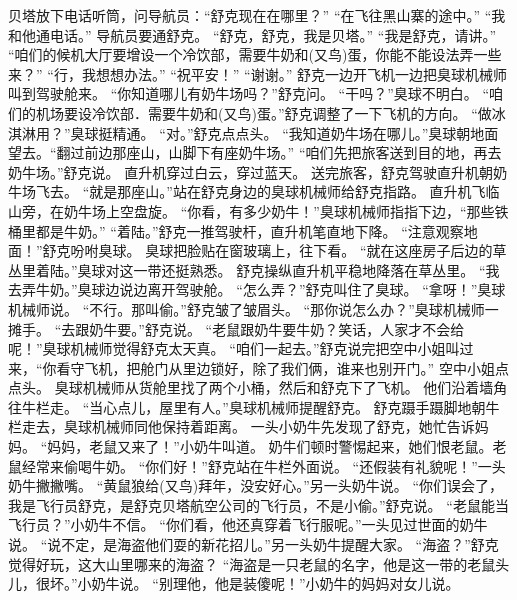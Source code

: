 \documentclass[a4paper,12pt,UTF8,twoside]{ctexbook}
\begin{document}
        贝塔放下电话听筒，问导航员：“舒克现在在哪里？” 
        “在飞往黑山寨的途中。” 
        “我和他通电话。” 
        导航员要通舒克。 
        “舒克，舒克，我是贝塔。” 
        “我是舒克，请讲。” 
        “咱们的候机大厅要增设一个冷饮部，需要牛奶和(又鸟)蛋，你能不能设法弄一些来？” 
        “行，我想想办法。” 
        “祝平安！” 
        “谢谢。” 
        舒克一边开飞机一边把臭球机械师叫到驾驶舱来。 
        “你知道哪儿有奶牛场吗？”舒克问。 
        “干吗？”臭球不明白。 
        “咱们的机场要设冷饮部．需要牛奶和(又鸟)蛋。”舒克调整了一下飞机的方向。 
        “做冰淇淋用？”臭球挺精通。 
        “对。”舒克点点头。 
        “我知道奶牛场在哪儿。”臭球朝地面望去。“翻过前边那座山，山脚下有座奶牛场。” 
        “咱们先把旅客送到目的地，再去奶牛场。”舒克说。 
        直升机穿过白云，穿过蓝天。 
        送完旅客，舒克驾驶直升机朝奶牛场飞去。 
        “就是那座山。”站在舒克身边的臭球机械师给舒克指路。 
        直升机飞临山旁，在奶牛场上空盘旋。 
        “你看，有多少奶牛！”臭球机械师指指下边，“那些铁桶里都是牛奶。” 
        “着陆。”舒克一推驾驶杆，直升机笔直地下降。 
        “注意观察地面！”舒克吩咐臭球。 
        臭球把脸贴在窗玻璃上，往下看。 
        “就在这座房子后边的草丛里着陆。”臭球对这一带还挺熟悉。 
        舒克操纵直升机平稳地降落在草丛里。 
        “我去弄牛奶。”臭球边说边离开驾驶舱。 
        “怎么弄？”舒克叫住了臭球。 
        “拿呀！”臭球机械师说。 
        “不行。那叫偷。”舒克皱了皱眉头。 
        “那你说怎么办？”臭球机械师一摊手。 
        “去跟奶牛要。”舒克说。 
        “老鼠跟奶牛要牛奶？笑话，人家才不会给呢！”臭球机械师觉得舒克太天真。 
        “咱们一起去。”舒克说完把空中小姐叫过来，“你看守飞机，把舱门从里边锁好，除了我们俩，谁来也别开门。” 
        空中小姐点点头。 
        臭球机械师从货舱里找了两个小桶，然后和舒克下了飞机。 
        他们沿着墙角往牛栏走。 
        “当心点儿，屋里有人。”臭球机械师提醒舒克。 
        舒克蹑手蹑脚地朝牛栏走去，臭球机械师同他保持着距离。 
        一头小奶牛先发现了舒克，她忙告诉妈妈。 
        “妈妈，老鼠又来了！”小奶牛叫道。 
        奶牛们顿时警惕起来，她们恨老鼠。老鼠经常来偷喝牛奶。 
        “你们好！”舒克站在牛栏外面说。 
        “还假装有礼貌呢！”一头奶牛撇撇嘴。 
        “黄鼠狼给(又鸟)拜年，没安好心。”另一头奶牛说。 
        “你们误会了，我是飞行员舒克，是舒克贝塔航空公司的飞行员，不是小偷。”舒克说。 
        “老鼠能当飞行员？”小奶牛不信。 
        “你们看，他还真穿着飞行服呢。”一头见过世面的奶牛说。 
        “说不定，是海盗他们耍的新花招儿。”另一头奶牛提醒大家。 
        “海盗？”舒克觉得好玩，这大山里哪来的海盗？ 
        “海盗是一只老鼠的名字，他是这一带的老鼠头儿，很坏。”小奶牛说。 
        “别理他，他是装傻呢！”小奶牛的妈妈对女儿说。 
\end{document}
